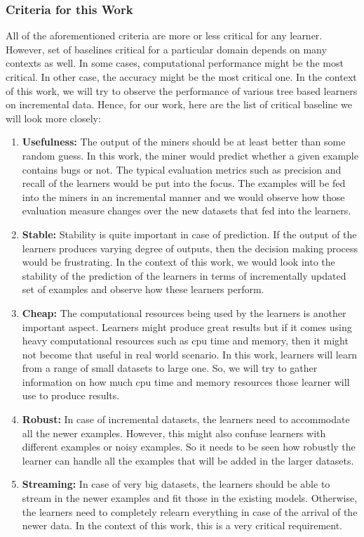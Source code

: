 \documentclass[sigplan]{acmart}\settopmatter{printfolios=true,printccs=false,printacmref=false}
\begin{document}
\subsubsection{Criteria for this Work}
All of the aforementioned criteria are more or less critical for any learner. However, set of baselines critical for a particular domain depends on many contexts as well. In some cases, computational performance might be the most critical. In other case, the accuracy might be the most critical one. In the context of this work, we will try to observe the performance of various tree based learners on incremental data. Hence, for our work, here are the list of critical baseline we will look more closely:
\begin{enumerate}
	\item \textbf{Usefulness: } The output of the miners should be at least better than some random guess. In this work, the miner would predict whether a given example contains bugs or not. The typical evaluation metrics such as precision and recall of the learners would be put into the focus. The examples will be fed into the miners in an incremental manner and we would observe how those evaluation measure changes over the new datasets that fed into the learners.
	\item \textbf{Stable: } Stability is quite important in case of prediction. If the output of the learners produces varying degree of outputs, then the decision making process would be frustrating. In the context of this work, we would look into the stability of the prediction of the learners in terms of incrementally updated set of examples and observe how these learners perform.
	\item \textbf{Cheap: } The computational resources being used by the learners is another important aspect. Learners might produce great results but if it comes using heavy computational resources such as cpu time and memory, then it might not become that useful in real world scenario. In this work, learners will learn from a range of small datasets to large one. So, we will try to gather information on how much cpu time and memory resources those learner will use to produce results.
	\item \textbf{Robust: } In case of incremental datasets, the learners need to accommodate all the newer examples. However, this might also confuse learners with different examples or noisy examples. So it needs to be seen how robustly the learner can handle all the examples that will be added in the larger datasets.
	\item \textbf{Streaming: } In case of very big datasets, the learners should be able to stream in the newer examples and fit those in the existing models. Otherwise, the learners need to completely relearn everything in case of the arrival of the newer data. In the context of this work, this is a very critical requirement.

\end{enumerate}
\end{document}
